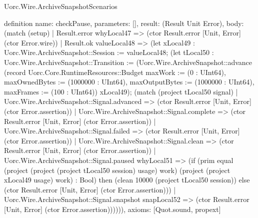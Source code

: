 \begin{lexlean}{Uorc.Wire.ArchiveSnapshotScenarios}
\begin{semanticmodule}
definition{
  name: checkPause,
  parameters: [],
  result: (Result Unit Error),
  body: (match (setup)
    | Result.error whyLocal47 => (ctor Result.error [Unit, Error] (ctor Error.wire))
    | Result.ok valueLocal48 => (let xLocal49 : Uorc.Wire.ArchiveSnapshot::Session := valueLocal48; (let tLocal50 : Uorc.Wire.ArchiveSnapshot::Transition := (Uorc.Wire.ArchiveSnapshot::advance (record Uorc.Core.RuntimeResources::Budget {maxWork := (0 : UInt64), maxOwnedBytes := (1000000 : UInt64), maxOutputBytes := (1000000 : UInt64), maxFrames := (100 : UInt64)}) xLocal49); (match (project tLocal50 signal)
      | Uorc.Wire.ArchiveSnapshot::Signal.advanced => (ctor Result.error [Unit, Error] (ctor Error.assertion))
      | Uorc.Wire.ArchiveSnapshot::Signal.complete => (ctor Result.error [Unit, Error] (ctor Error.assertion))
      | Uorc.Wire.ArchiveSnapshot::Signal.failed => (ctor Result.error [Unit, Error] (ctor Error.assertion))
      | Uorc.Wire.ArchiveSnapshot::Signal.clean => (ctor Result.error [Unit, Error] (ctor Error.assertion))
      | Uorc.Wire.ArchiveSnapshot::Signal.paused whyLocal51 => (if (prim equal (project (project (project tLocal50 session) usage) work) (project (project xLocal49 usage) work) : Bool) then (clean 10000 (project tLocal50 session)) else (ctor Result.error [Unit, Error] (ctor Error.assertion)))
      | Uorc.Wire.ArchiveSnapshot::Signal.snapshot snapLocal52 => (ctor Result.error [Unit, Error] (ctor Error.assertion)))))),
  axioms: [Quot.sound, propext]
}


\end{semanticmodule}
\end{lexlean}
